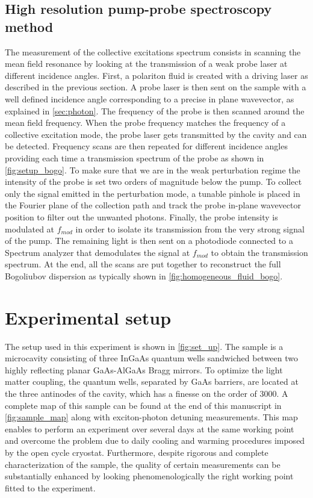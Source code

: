 \subsection{High resolution pump-probe spectroscopy method}

\label{sub:high_resolution_spectroscopy}

The measurement of the collective excitations spectrum consists in scanning the mean field resonance by looking at the transmission of a weak probe laser at different incidence angles. First, a polariton fluid is created with a driving laser as described in the previous section. A probe laser is then sent on the sample with a well defined incidence angle corresponding to a precise in plane wavevector, as explained in \autoref{sec:photon}. The frequency of 
the probe is then scanned around the mean field frequency. When the probe frequency matches the frequency of a collective excitation mode, the probe laser gets transmitted by the cavity and can be detected. Frequency scans are then repeated for different incidence angles providing each time a transmission spectrum of the probe as shown in \autoref{fig:setup_bogo}. 
To make sure that we are in the weak perturbation regime the intensity of the probe is set two orders of magnitude below the pump. To collect only the signal emitted in the perturbation mode, a tunable pinhole is placed in the Fourier plane of the collection path and track the probe in-plane wavevector position to filter out the unwanted photons. Finally, the probe intensity is modulated at $f_{mod}$ in order to isolate its transmission from the very strong signal of the pump. The remaining light is then sent on
a photodiode connected to a Spectrum analyzer that demodulates the signal at $f_{mod}$ to obtain the transmission spectrum. At the end, all the scans are put together to reconstruct the full Bogoliubov dispersion as typically shown in \autoref{fig:homogeneous_fluid_bogo}.



\section{Experimental setup}
The setup used in this experiment is shown in \autoref{fig:set_up}. The sample is a microcavity consisting of three InGaAs quantum wells sandwiched between two highly reflecting planar GaAs-AlGaAs Bragg mirrors.
To optimize the light matter coupling, the quantum wells, separated by GaAs barriers, are located at the three antinodes of the cavity, which has a finesse on the order of 3000. A complete map of this sample 
 can be found at the end of this manuscript in \autoref{fig:sample_map} along with exciton-photon detuning measurements. This map enables to perform an experiment over several days at the same working point and overcome the problem due to daily cooling and warming procedures imposed by the open cycle cryostat. Furthermore, despite rigorous and complete
 characterization of the sample, the quality of certain measurements can be substantially enhanced by looking phenomenologically the right working point fitted to the experiment. 
 
